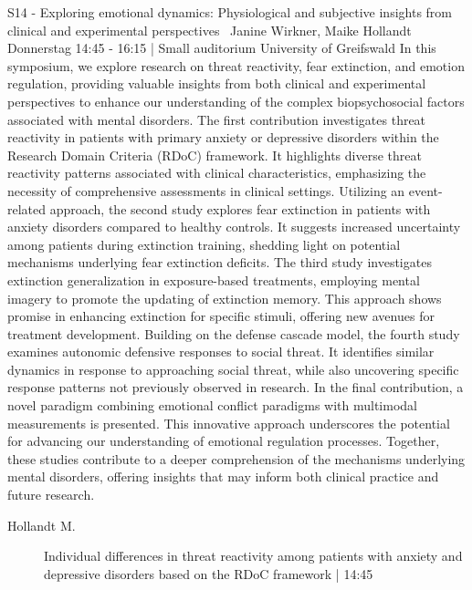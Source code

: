 
            \begin{symposium}
            {S14 - Exploring emotional dynamics: Physiological and subjective insights from clinical and experimental perspectives }
            { Janine Wirkner, Maike Hollandt}
            {Donnerstag 14:45 - 16:15 | Small auditorium}
            {University of Greifswald}
            In this symposium, we explore research on threat reactivity, fear extinction, and emotion regulation, providing valuable insights from both clinical and experimental perspectives to enhance our understanding of the complex biopsychosocial factors associated with mental disorders.
The first contribution investigates threat reactivity in patients with primary anxiety or depressive disorders within the Research Domain Criteria (RDoC) framework. It highlights diverse threat reactivity patterns associated with clinical characteristics, emphasizing the necessity of comprehensive assessments in clinical settings. Utilizing an event-related approach, the second study explores fear extinction in patients with anxiety disorders compared to healthy controls. It suggests increased uncertainty among patients during extinction training, shedding light on potential mechanisms underlying fear extinction deficits. The third study investigates extinction generalization in exposure-based treatments, employing mental imagery to promote the updating of extinction memory. This approach shows promise in enhancing extinction for specific stimuli, offering new avenues for treatment development. Building on the defense cascade model, the fourth study examines autonomic defensive responses to social threat. It identifies similar dynamics in response to approaching social threat, while also uncovering specific response patterns not previously observed in research. In the final contribution, a novel paradigm combining emotional conflict paradigms with multimodal measurements is presented. This innovative approach underscores the potential for advancing our understanding of emotional regulation processes. Together, these studies contribute to a deeper comprehension of the mechanisms underlying mental disorders, offering insights that may inform both clinical practice and future research.
            \begin{description}    
            
                \item [ Hollandt M.] Individual differences in threat reactivity among patients with anxiety and depressive disorders based on the RDoC framework \textcolor{mygray}{ | 14:45}    
                

\end{description}
\end{symposium}
